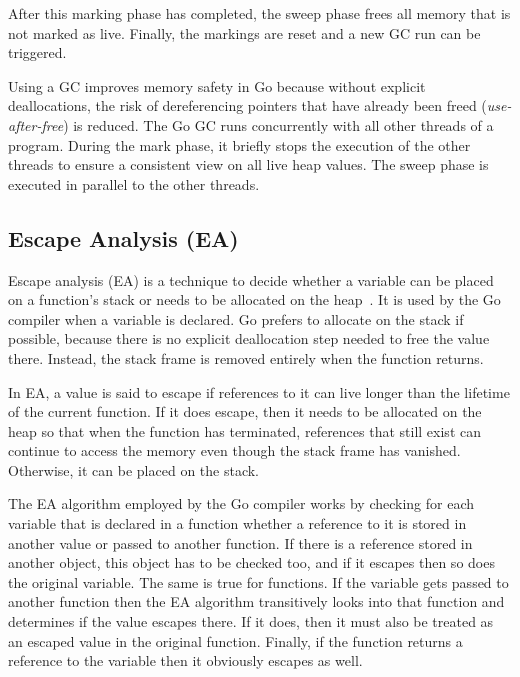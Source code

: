 After this marking phase has completed, the sweep phase frees all memory that is not marked as live.
Finally, the markings are reset and a new \acrshort{GC} run can be triggered.

Using a \acrshort{GC} improves memory safety in Go because without explicit deallocations, the risk of dereferencing
pointers that have already been freed (\textit{use-after-free}) is reduced.
The Go GC runs concurrently with all other threads of a program.
During the mark phase, it briefly stops the execution of the other threads to ensure a consistent view on all live
heap values.
The sweep phase is executed in parallel to the other threads.



\subsection{Escape Analysis (EA)}\label{subsec:background:memory:ea}

Escape analysis (\acrshort{EA}) is a technique to decide whether a variable can be placed on a function's stack or needs
to be allocated on the heap~\cite{choi1999}.
It is used by the Go compiler when a variable is declared.
Go prefers to allocate on the stack if possible, because there is no explicit deallocation step needed to free the value
there.
Instead, the stack frame is removed entirely when the function returns.

In \acrshort{EA}, a value is said to escape if references to it can live longer than the lifetime of the current
function.
If it does escape, then it needs to be allocated on the heap so that when the function has terminated, references that
still exist can continue to access the memory even though the stack frame has vanished.
Otherwise, it can be placed on the stack.

The \acrshort{EA} algorithm employed by the Go compiler works by checking for each variable that is declared in a
function whether a reference to it is stored in another value or passed to another function.
If there is a reference stored in another object, this object has to be checked too, and if it escapes then so does the
original variable.
The same is true for functions.
If the variable gets passed to another function then the \acrshort{EA} algorithm transitively looks into that function
and determines if the value escapes there.
If it does, then it must also be treated as an escaped value in the original function.
Finally, if the function returns a reference to the variable then it obviously escapes as well.



